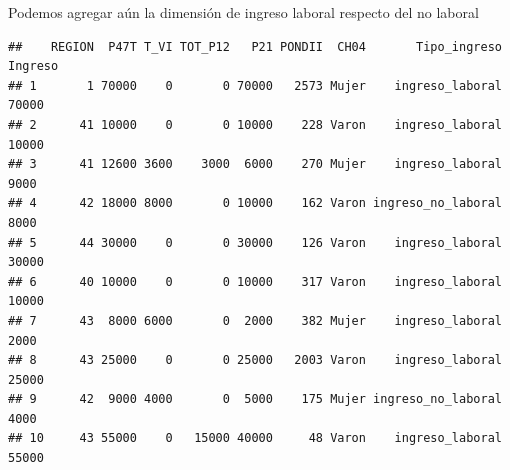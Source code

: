 \documentclass[]{book}
\newenvironment{Shaded}{\begin{snugshade}}{\end{snugshade}}
\newcommand{\CommentTok}[1]{\textcolor[rgb]{0.56,0.35,0.01}{\textit{#1}}}
\newcommand{\DataTypeTok}[1]{\textcolor[rgb]{0.13,0.29,0.53}{#1}}
\newcommand{\DecValTok}[1]{\textcolor[rgb]{0.00,0.00,0.81}{#1}}
\newcommand{\KeywordTok}[1]{\textcolor[rgb]{0.13,0.29,0.53}{\textbf{#1}}}
\newcommand{\NormalTok}[1]{#1}
\newcommand{\OperatorTok}[1]{\textcolor[rgb]{0.81,0.36,0.00}{\textbf{#1}}}
\newcommand{\StringTok}[1]{\textcolor[rgb]{0.31,0.60,0.02}{#1}}
\begin{document}
Podemos agregar aún la dimensión de ingreso laboral respecto del no laboral

\begin{Shaded}
\end{Shaded}

\begin{verbatim}
##    REGION  P47T T_VI TOT_P12   P21 PONDII  CH04       Tipo_ingreso Ingreso
## 1       1 70000    0       0 70000   2573 Mujer    ingreso_laboral   70000
## 2      41 10000    0       0 10000    228 Varon    ingreso_laboral   10000
## 3      41 12600 3600    3000  6000    270 Mujer    ingreso_laboral    9000
## 4      42 18000 8000       0 10000    162 Varon ingreso_no_laboral    8000
## 5      44 30000    0       0 30000    126 Varon    ingreso_laboral   30000
## 6      40 10000    0       0 10000    317 Varon    ingreso_laboral   10000
## 7      43  8000 6000       0  2000    382 Mujer    ingreso_laboral    2000
## 8      43 25000    0       0 25000   2003 Varon    ingreso_laboral   25000
## 9      42  9000 4000       0  5000    175 Mujer ingreso_no_laboral    4000
## 10     43 55000    0   15000 40000     48 Varon    ingreso_laboral   55000
\end{verbatim}
\end{document}

